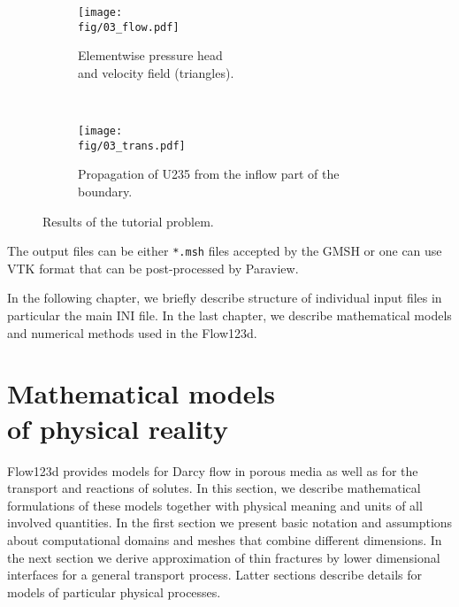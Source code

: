 \documentclass[12pt,a4paper]{report}
\def\fig{figures}
\begin{document}
\begin{figure}
    \centering
    \begin{subfigure}[b]{0.45\textwidth}
        \centering
        \texttt{[image: \\fig/03\_flow.pdf]}
        \caption{Elementwise pressure head\\and velocity field (triangles).}
        \label{fig:tut-flow}
    \end{subfigure}
    ~
    \begin{subfigure}[b]{0.45\textwidth}
        \centering
        \texttt{[image: \\fig/03\_trans.pdf]}
        \caption{Propagation of U235 from the inflow part of the boundary.}
        \label{fig:tut-trans}
    \end{subfigure}
    \caption{Results of the tutorial problem.}
    \label{fig:tutorial}
\end{figure}



The output files can be either \verb'*.msh' files accepted by the GMSH or one can use VTK format that can be post-processed by Paraview.

In the following chapter, we briefly describe structure of individual input files in particular the main INI file. In the last chapter, we describe
mathematical models and numerical methods used in the Flow123d.


\chapter{Mathematical models \\of physical reality}
\label{PhysicalModels}

Flow123d provides models for Darcy flow in porous media as well as for the transport and reactions of solutes. In this section, we describe 
mathematical formulations of these models together with physical meaning and units of all involved quantities. In the first section we present 
basic notation and assumptions about computational domains and meshes that combine different dimensions. In the next section we
derive approximation of thin fractures by lower dimensional interfaces for a general transport process. Latter sections describe details for models of particular
physical processes.
\end{document}
